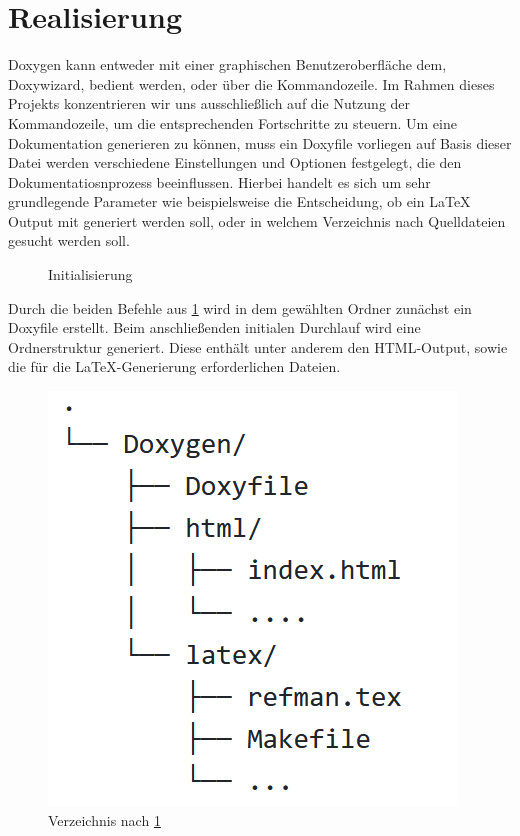 \documentclass[11pt,a4paper]{report}
\begin{document}
\section{Realisierung}
Doxygen kann entweder mit einer graphischen Benutzeroberfläche dem, \glqq Doxywizard\grqq{}, bedient werden, oder über die Kommandozeile. Im Rahmen dieses Projekts konzentrieren wir uns ausschließlich auf die Nutzung der Kommandozeile, um die entsprechenden Fortschritte zu steuern. Um eine Dokumentation generieren zu können, muss ein \glqq Doxyfile\grqq{} vorliegen auf Basis dieser Datei werden verschiedene Einstellungen und Optionen festgelegt, die den Dokumentatiosnprozess beeinflussen. Hierbei handelt es sich um sehr grundlegende Parameter wie beispielsweise die Entscheidung, ob ein LaTeX Output mit generiert werden soll, oder in welchem Verzeichnis nach Quelldateien gesucht werden soll.
\begin{figure}[h]
  \centering
  \hfill
  \caption{Initialisierung}
  \label{fig:doxygen-init}
\end{figure}

\noindent
Durch die beiden Befehle aus \ref{fig:doxygen-init} wird in dem gewählten Ordner zunächst ein Doxyfile erstellt. Beim anschließenden initialen Durchlauf wird eine Ordnerstruktur generiert. Diese enthält unter anderem den HTML-Output, sowie die für die LaTeX-Generierung erforderlichen Dateien.

\begin{figure}[h]
    \centering
    \includegraphics[height=0.35 \textwidth]{images/Tree_view.png}
    \caption{Verzeichnis nach \ref{fig:doxygen-init}}
    \label{fig:File_Tree}
\end{figure}
\end{document}
